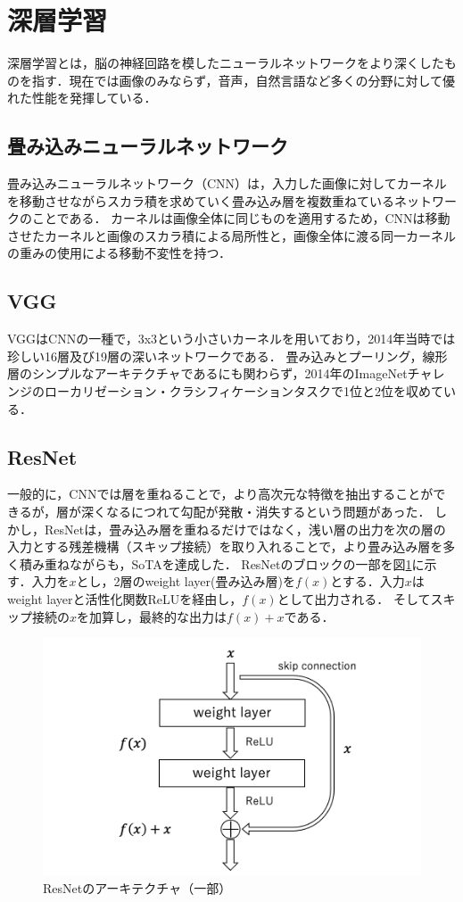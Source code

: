 \documentclass[a4paper, oneside, openany, dvipdfmx]{suribt}%
\newcommand{\fref}[1]{図\ref{#1}}
\begin{document}
\section{深層学習}
深層学習とは，脳の神経回路を模したニューラルネットワークをより深くしたものを指す．現在では画像のみならず，音声，自然言語など多くの分野に対して優れた性能を発揮している．
\subsection{畳み込みニューラルネットワーク}
畳み込みニューラルネットワーク（CNN）は，入力した画像に対してカーネルを移動させながらスカラ積を求めていく畳み込み層を複数重ねているネットワークのことである．
カーネルは画像全体に同じものを適用するため，CNNは移動させたカーネルと画像のスカラ積による局所性と，画像全体に渡る同一カーネルの重みの使用による移動不変性を持つ．
\subsection{VGG}
VGGはCNNの一種で，3x3という小さいカーネルを用いており，2014年当時では珍しい16層及び19層の深いネットワークである\cite{simonyan2015deep}．
畳み込みとプーリング，線形層のシンプルなアーキテクチャであるにも関わらず，2014年のImageNetチャレンジのローカリゼーション・クラシフィケーションタスクで1位と2位を収めている．

\subsection{ResNet}
一般的に，CNNでは層を重ねることで，より高次元な特徴を抽出することができるが，層が深くなるにつれて勾配が発散・消失するという問題があった．
しかし，ResNetは，畳み込み層を重ねるだけではなく，浅い層の出力を次の層の入力とする残差機構（スキップ接続）を取り入れることで，より畳み込み層を多く積み重ねながらも，SoTAを達成した\cite{he2015deep}．
ResNetのブロックの一部を\fref{fig:res_arch}に示す．入力を$x$とし，2層のweight layer(畳み込み層)を$f(x)$とする．入力$x$はweight layerと活性化関数ReLUを経由し，$f(x)$として出力される．
そしてスキップ接続の$x$を加算し，最終的な出力は$f(x)+x$である．
\begin{figure}[H]
  \centering
  \includegraphics[width=0.9\linewidth]{figs/resnet.png}
  \caption{ResNetのアーキテクチャ（一部）\cite{he2015deep}}
  \label{fig:res_arch}
\end{figure}
\end{document}

